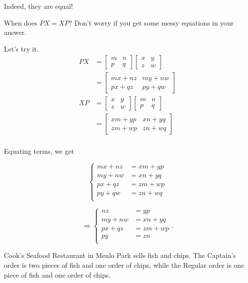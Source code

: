 \documentclass[../gatm_answers.tex]{subfiles}
\begin{document}
Indeed, they are equal!

\begin{outer_problem}
\item When does $PX=XP$? Don't worry if you get some messy equations in your answer.
\end{outer_problem}

Let's try it.
\begin{align*}
PX &= \begin{bmatrix} m & n \\ p & q \end{bmatrix}\begin{bmatrix} x & y \\ z & w \end{bmatrix} \\
&= \begin{bmatrix} mx+nz & my+nw \\ px + qz & py + qw \end{bmatrix} \\
XP &= \begin{bmatrix} x & y \\ z & w \end{bmatrix} \begin{bmatrix} m & n \\ p & q \end{bmatrix} \\
&= \begin{bmatrix} xm + yp & xn + yq \\ zm + wp & zn + wq \end{bmatrix} \\
\end{align*}

Equating terms, we get

$$\begin{cases}
mx + nz &= xm + yp \\
my + nw &= xn + yq \\
px + qz &= zm + wp \\
py + qw &= zn + wq \\
\end{cases}$$

$$\Longrightarrow \begin{cases}
nz &= yp \\
my + nw &= xn + yq \\
px + qz &= zm + wp \\
py &= zn \\
\end{cases}.$$

\begin{outer_problem}
\item Cook's Seafood Restaurant in Menlo Park sells fish and chips. The Captain's order is two pieces of fish and one order of chips, while the Regular order is one piece of fish and one order of chips.
\end{outer_problem}
\end{document}
